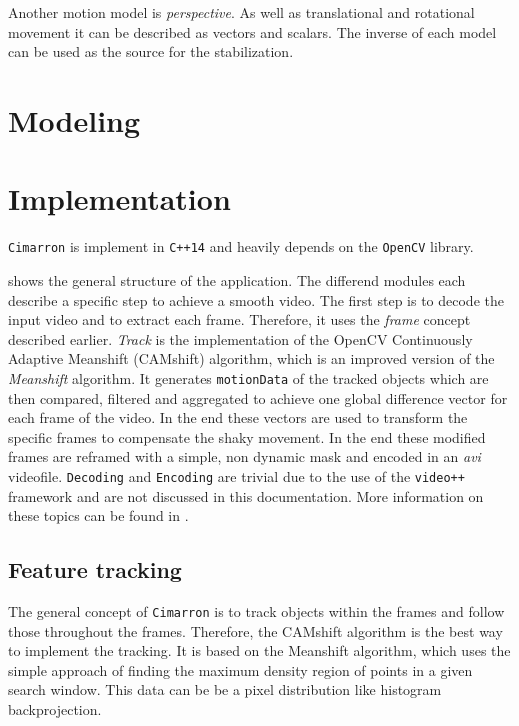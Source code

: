 Another motion model is \textit{perspective}. As well as translational and rotational movement it can be described as vectors and scalars. The inverse of each model can be used as the source for the stabilization.


\section{Modeling}

\section{Implementation}
\texttt{Cimarron} is implement in \texttt{C++14} and heavily depends on the \texttt{OpenCV} library.
\begin{figure}[h!]\centering
\end{figure}
 shows the general structure of the application. The differend modules each describe a specific step to achieve a smooth video. The first step is to decode the input video and to extract each frame. Therefore, it uses the \textit{frame} concept described earlier. \textit{Track} is the implementation of the OpenCV Continuously Adaptive Meanshift (CAMshift) algorithm, which is an improved version of the \textit{Meanshift} algorithm. It generates \texttt{motionData} of the tracked objects which are then compared, filtered and aggregated to achieve one global difference vector for each frame of the video. In the end these vectors are used to transform the specific frames to compensate the shaky movement. In the end these modified frames are reframed with a simple, non dynamic mask and encoded in an \textit{avi} videofile.
\texttt{Decoding} and \texttt{Encoding} are trivial due to the use of the \texttt{video++} framework and are not discussed in this documentation. More information on these topics can be found in \cite{7115639,matt42vp0:online}.

\subsection{Feature tracking}
The general concept of \texttt{Cimarron} is to track objects within the frames and follow those throughout the frames. Therefore, the CAMshift algorithm is the best way to implement the tracking. It is based on the Meanshift algorithm, which uses the simple approach of finding the maximum density region of points in a given search window. This data can be be a pixel distribution like histogram backprojection.

